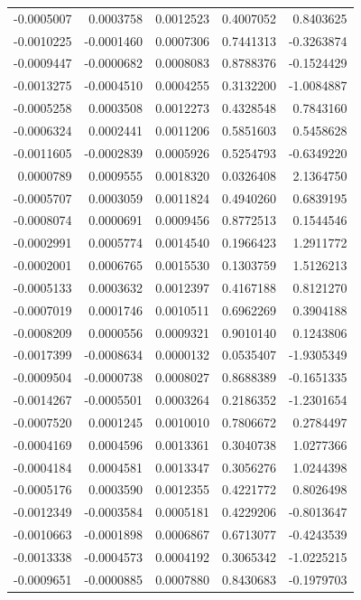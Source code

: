 \documentclass[]{tufte-handout}
\begin{document}
\begin{longtable}[]{@{}rrrrr@{}}
-0.0005007 & 0.0003758 & 0.0012523 & 0.4007052 & 0.8403625 \\
-0.0010225 & -0.0001460 & 0.0007306 & 0.7441313 & -0.3263874 \\
-0.0009447 & -0.0000682 & 0.0008083 & 0.8788376 & -0.1524429 \\
-0.0013275 & -0.0004510 & 0.0004255 & 0.3132200 & -1.0084887 \\
-0.0005258 & 0.0003508 & 0.0012273 & 0.4328548 & 0.7843160 \\
-0.0006324 & 0.0002441 & 0.0011206 & 0.5851603 & 0.5458628 \\
-0.0011605 & -0.0002839 & 0.0005926 & 0.5254793 & -0.6349220 \\
0.0000789 & 0.0009555 & 0.0018320 & 0.0326408 & 2.1364750 \\
-0.0005707 & 0.0003059 & 0.0011824 & 0.4940260 & 0.6839195 \\
-0.0008074 & 0.0000691 & 0.0009456 & 0.8772513 & 0.1544546 \\
-0.0002991 & 0.0005774 & 0.0014540 & 0.1966423 & 1.2911772 \\
-0.0002001 & 0.0006765 & 0.0015530 & 0.1303759 & 1.5126213 \\
-0.0005133 & 0.0003632 & 0.0012397 & 0.4167188 & 0.8121270 \\
-0.0007019 & 0.0001746 & 0.0010511 & 0.6962269 & 0.3904188 \\
-0.0008209 & 0.0000556 & 0.0009321 & 0.9010140 & 0.1243806 \\
-0.0017399 & -0.0008634 & 0.0000132 & 0.0535407 & -1.9305349 \\
-0.0009504 & -0.0000738 & 0.0008027 & 0.8688389 & -0.1651335 \\
-0.0014267 & -0.0005501 & 0.0003264 & 0.2186352 & -1.2301654 \\
-0.0007520 & 0.0001245 & 0.0010010 & 0.7806672 & 0.2784497 \\
-0.0004169 & 0.0004596 & 0.0013361 & 0.3040738 & 1.0277366 \\
-0.0004184 & 0.0004581 & 0.0013347 & 0.3056276 & 1.0244398 \\
-0.0005176 & 0.0003590 & 0.0012355 & 0.4221772 & 0.8026498 \\
-0.0012349 & -0.0003584 & 0.0005181 & 0.4229206 & -0.8013647 \\
-0.0010663 & -0.0001898 & 0.0006867 & 0.6713077 & -0.4243539 \\
-0.0013338 & -0.0004573 & 0.0004192 & 0.3065342 & -1.0225215 \\
-0.0009651 & -0.0000885 & 0.0007880 & 0.8430683 & -0.1979703 \\

\end{longtable}
\end{document}
